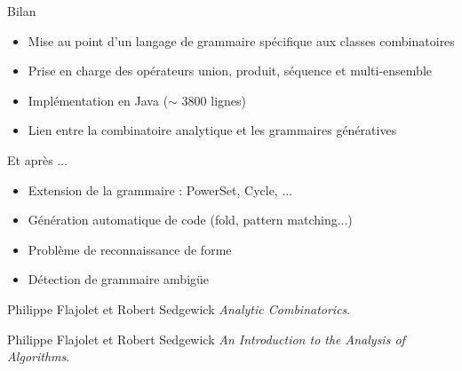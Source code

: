 \documentclass{beamer}
\begin{document}
\begin{frame}{Bilan}
\begin{itemize}
\item Mise au point d'un langage de grammaire spécifique aux classes combinatoires
\item Prise en charge des opérateurs union, produit, séquence et multi-ensemble
\item Implémentation en Java ($\sim$ 3800 lignes) \\
  \footnotesize{}
\normalsize
\item Lien entre la combinatoire analytique et les grammaires génératives
\end{itemize}
\end{frame}



\begin{frame}{Et après ...}
\begin{itemize}
\item Extension de la grammaire : PowerSet, Cycle, ... 
\item Génération automatique de code (fold, pattern matching...)
\item Problème de reconnaissance de forme
\item Détection de grammaire ambigüe
\end{itemize}
\begin{thebibliography}{9}
    Philippe Flajolet et Robert Sedgewick
    \emph{ Analytic Combinatorics}.

    Philippe Flajolet et Robert Sedgewick
    \emph{An Introduction to the Analysis of Algorithms}.

  \end{thebibliography}
\end{frame}
\end{document}
